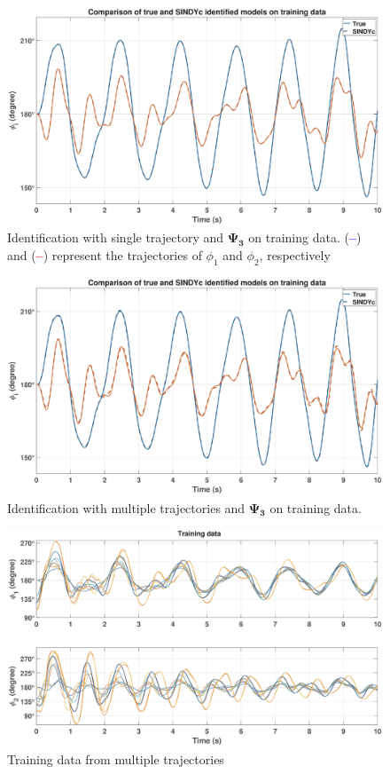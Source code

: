 \begin{figure}[ht]
    \centering
    \includegraphics[width=0.915\linewidth]{figures/SingleTrajTrain_2_0_1}
    \caption{Identification with single trajectory and $\mathbf{\Psi_3}$ on training data. (\textcolor{blue}{\textbf{--}}) and (\textcolor{red}{\textbf{--}}) represent the trajectories of $\phi_1$ and $\phi_2$, respectively}
\label{fig:SingleTrajTrain}
\end{figure}
\vspace{0em}
\begin{figure}[ht]
    \centering
    \includegraphics[width=0.915\linewidth]{figures/MultTrajtrain_2_0_1}
    \caption{Identification with multiple trajectories and $\mathbf{\Psi_3}$ on training data.}
    \label{fig: MultTrajTrain}
\end{figure}
% 
% 
\begin{figure}[ht]
    \centering
    \includegraphics[width=1\linewidth]{figures/TrainingData}
    \caption{Training data from multiple trajectories}
    \label{fig:TrainingData}
\end{figure}

